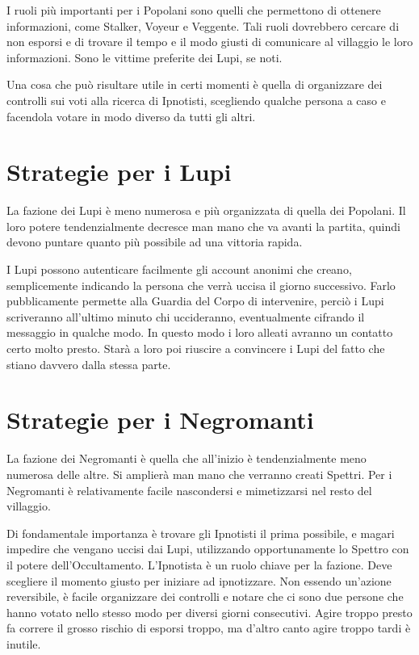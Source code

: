 \documentclass[a4paper,10pt]{article}
\begin{document}
I ruoli più importanti per i Popolani sono quelli che permettono di ottenere informazioni, come Stalker, Voyeur e Veggente. Tali ruoli dovrebbero cercare di non esporsi e di trovare il tempo e il modo giusti di comunicare al villaggio le loro informazioni. Sono le vittime preferite dei Lupi, se noti.

Una cosa che può risultare utile in certi momenti è quella di organizzare dei controlli sui voti alla ricerca di Ipnotisti, scegliendo qualche persona a caso e facendola votare in modo diverso da tutti gli altri.

\section{Strategie per i Lupi}

La fazione dei Lupi è meno numerosa e più organizzata di quella dei Popolani. Il loro potere tendenzialmente decresce man mano che va avanti la partita, quindi devono puntare quanto più possibile ad una vittoria rapida.

I Lupi possono autenticare facilmente gli account anonimi che creano, semplicemente indicando la persona che verrà uccisa il giorno successivo. Farlo pubblicamente permette alla Guardia del Corpo di intervenire, perciò i Lupi scriveranno all'ultimo minuto chi uccideranno, eventualmente cifrando il messaggio in qualche modo. In questo modo i loro alleati avranno un contatto certo molto presto. Starà a loro poi riuscire a convincere i Lupi del fatto che stiano davvero dalla stessa parte.

\section{Strategie per i Negromanti}

La fazione dei Negromanti è quella che all'inizio è tendenzialmente meno numerosa delle altre. Si amplierà man mano che verranno creati Spettri. Per i Negromanti è relativamente facile nascondersi e mimetizzarsi nel resto del villaggio.

Di fondamentale importanza è trovare gli Ipnotisti il prima possibile, e magari impedire che vengano uccisi dai Lupi, utilizzando opportunamente lo Spettro con il potere dell'Occultamento. L'Ipnotista è un ruolo chiave per la fazione. Deve scegliere il momento giusto per iniziare ad ipnotizzare. Non essendo un'azione reversibile, è facile organizzare dei controlli e notare che ci sono due persone che hanno votato nello stesso modo per diversi giorni consecutivi. Agire troppo presto fa correre il grosso rischio di esporsi troppo, ma d'altro canto agire troppo tardi è inutile.
\end{document}
